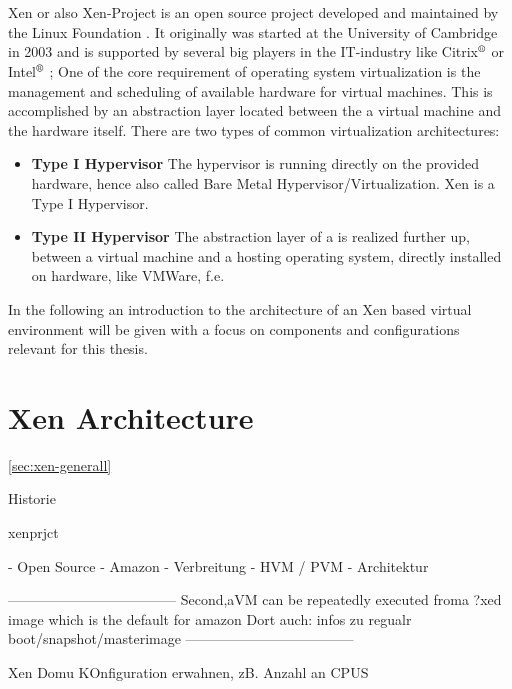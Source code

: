 \\~\\
Xen or also Xen-Project is an open source project developed and maintained by the Linux Foundation
. It originally was started at the University of Cambridge in 2003 and is supported by several 
big players in the IT-industry like Citrix$^\text{\textregistered}$ or Intel$^\text{\textregistered}$ \cite{xenprjct}; One of the core requirement of operating system virtualization is the management and scheduling of available hardware for virtual machines. This is accomplished by an abstraction layer located between the a virtual machine and the hardware itself. There are two types of common virtualization architectures:

\begin{itemize}
	\item \textbf{Type I Hypervisor} The hypervisor is running directly on the provided hardware, hence also called Bare Metal Hypervisor/Virtualization. Xen is a Type I Hypervisor. 
	\item \textbf{Type II Hypervisor} The abstraction layer of a is realized further up, between a virtual machine and a hosting operating system, directly installed on hardware, like VMWare, f.e. 
\end{itemize}

In the following an introduction to the architecture of an Xen based virtual environment will be given with a focus on components and configurations relevant for this thesis. 


\section{Xen Architecture}




\ref{sec:xen-generall}



Historie

xenprjct

- Open Source
- Amazon
- Verbreitung 
- HVM / PVM
- Architektur

------------------------------------
\cite{everspaugh2014not}
Second,aVM  can be repeatedly executed froma ?xed image which is the default for amazon
Dort auch: infos zu regualr boot/snapshot/masterimage
------------------------------------

Xen Domu KOnfiguration erwahnen, zB. Anzahl an CPUS


